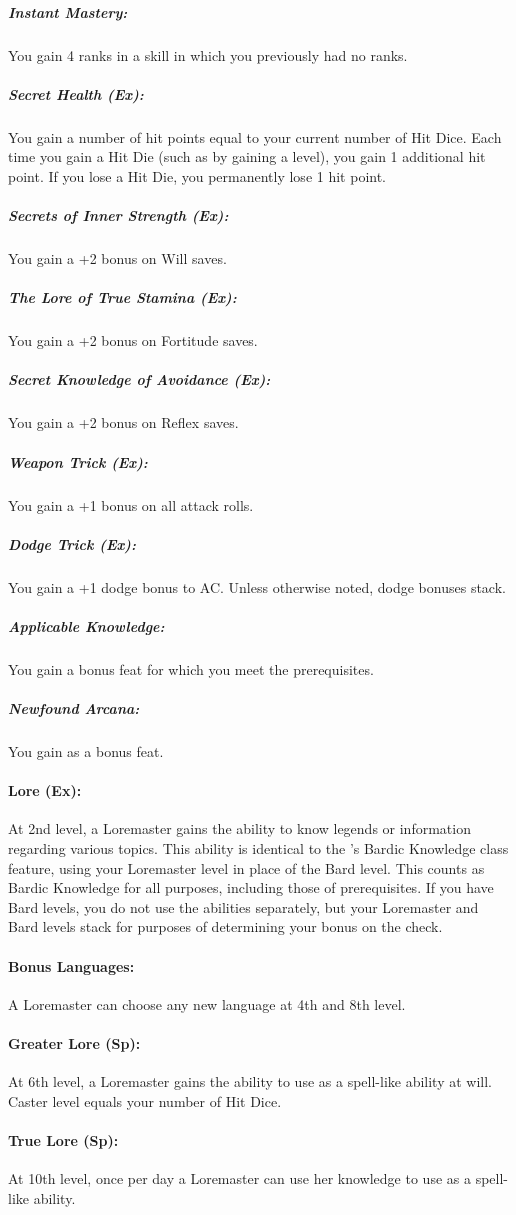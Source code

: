 \subparagraph{Instant Mastery:}
You gain 4 ranks in a skill in which you previously had no ranks.\\
\subparagraph{Secret Health (Ex):}
You gain a number of hit points equal to your current number of Hit Dice. 
Each time you gain a Hit Die (such as by gaining a level), you gain 1 additional hit point. 
If you lose a Hit Die, you permanently lose 1 hit point.
\subparagraph{Secrets of Inner Strength (Ex):}
You gain a +2 bonus on Will saves.
\subparagraph{The Lore of True Stamina (Ex):}
You gain a +2 bonus on Fortitude saves.
\subparagraph{Secret Knowledge of Avoidance (Ex):}
You gain a +2 bonus on Reflex saves.
\subparagraph{Weapon Trick (Ex):}
You gain a +1 bonus on all attack rolls.
\subparagraph{Dodge Trick (Ex):}
You gain a +1 dodge bonus to AC. Unless otherwise noted, dodge bonuses stack.
\subparagraph{Applicable Knowledge:}
You gain a bonus feat for which you meet the prerequisites.
\subparagraph{Newfound Arcana:}
You gain  as a bonus feat.

\paragraph{Lore (Ex):}
At 2nd level, a Loremaster gains the ability to know legends or information regarding various topics. This ability is identical to the 's Bardic Knowledge class feature, using your Loremaster level in place of the Bard level. This counts as Bardic Knowledge for all purposes, including those of prerequisites. If you have Bard levels, you do not use the abilities separately, but your Loremaster and Bard levels stack for purposes of determining your bonus on the check.

\paragraph{Bonus Languages:}
A Loremaster can choose any new language at 4th and 8th level.

\paragraph{Greater Lore (Sp):}
At 6th level, a Loremaster gains the ability to use  as a spell-like ability at will.
Caster level equals your number of Hit Dice.

\paragraph{True Lore (Sp):}
At 10th level, once per day a Loremaster can use her knowledge to use  as a spell-like ability.